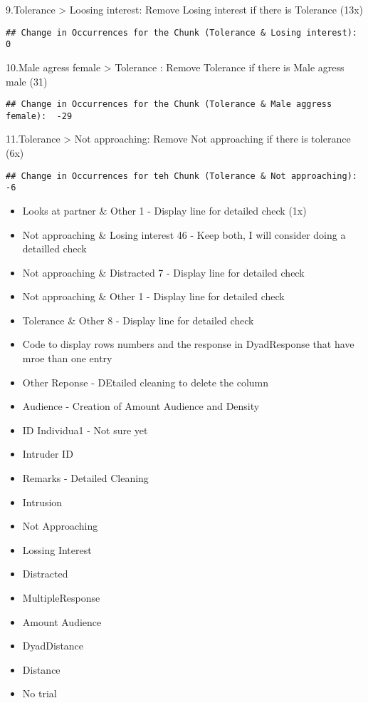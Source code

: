 \documentclass[
]{article}
\begin{document}
9.Tolerance \textgreater{} Loosing interest: Remove Losing interest if
there is Tolerance (13x)

\begin{verbatim}
## Change in Occurrences for the Chunk (Tolerance & Losing interest):  0
\end{verbatim}

10.Male agress female \textgreater{} Tolerance : Remove Tolerance if
there is Male agress male (31)

\begin{verbatim}
## Change in Occurrences for the Chunk (Tolerance & Male aggress female):  -29
\end{verbatim}

11.Tolerance \textgreater{} Not approaching: Remove Not approaching if
there is tolerance (6x)

\begin{verbatim}
## Change in Occurrences for teh Chunk (Tolerance & Not approaching):  -6
\end{verbatim}

\begin{itemize}
\item
  Looks at partner \& Other 1 - Display line for detailed check (1x)
\item
  Not approaching \& Losing interest 46 - Keep both, I will consider
  doing a detailled check
\item
  Not approaching \& Distracted 7 - Display line for detailed check
\item
  Not approaching \& Other 1 - Display line for detailed check
\item
  Tolerance \& Other 8 - Display line for detailed check
\item
  Code to display rows numbers and the response in DyadResponse that
  have mroe than one entry
\item
  Other Reponse - DEtailed cleaning to delete the column
\item
  Audience - Creation of Amount Audience and Density
\item
  ID Individua1 - Not sure yet
\item
  Intruder ID
\item
  Remarks - Detailed Cleaning
\item
  Intrusion
\item
  Not Approaching
\item
  Lossing Interest
\item
  Distracted
\item
  MultipleResponse
\item
  Amount Audience
\item
  DyadDistance
\item
  Distance
\item
  No trial
\end{itemize}
\end{document}
